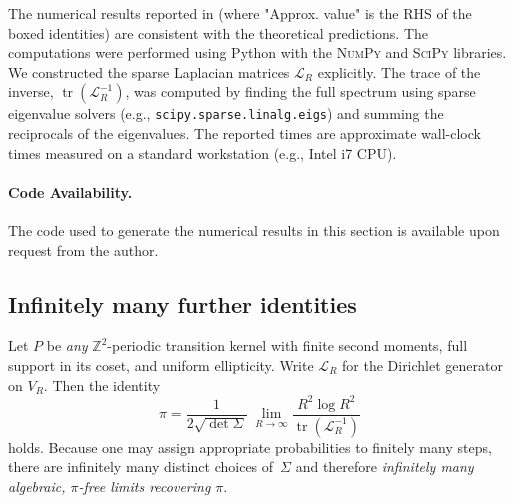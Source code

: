 \documentclass[11pt]{article}
\numberwithin{equation}{section}
\DeclareMathOperator{\tr}{tr}
\begin{document}
The numerical results reported in  (where "Approx. value" is the RHS of the boxed identities) are consistent with the theoretical predictions. The computations were performed using Python with the \textsc{NumPy} and \textsc{SciPy} libraries. We constructed the sparse Laplacian matrices $\mathcal{L}_R$ explicitly. The trace of the inverse, $\tr(\mathcal{L}_R^{-1})$, was computed by finding the full spectrum using sparse eigenvalue solvers (e.g., \texttt{scipy.sparse.linalg.eigs}) and summing the reciprocals of the eigenvalues. The reported times are approximate wall-clock times measured on a standard workstation (e.g., Intel i7 CPU).

\paragraph{Code Availability.} The code used to generate the numerical results in this section is available upon request from the author.


\subsection{Infinitely many further identities}\label{app:infinite}

Let \(P\) be \emph{any} $\mathbb{Z}^{2}$-periodic transition kernel
with finite second moments, full support in its coset, and
uniform ellipticity.
Write \( \mathcal{L}_R \) for the Dirichlet generator on \( V_R \).
Then the identity
\[\pi=\frac{1}{2\sqrt{\det\Sigma}}\;\lim_{R\to\infty}\frac{R^{2}\log R^{2}}{\tr(\mathcal{L}_R^{-1})}\]
holds.
Because one may assign appropriate probabilities to
finitely many steps, there are infinitely many distinct choices of~\(\Sigma\) and therefore
\emph{infinitely many algebraic, $\pi$-free limits recovering $\pi$}.
\end{document}
